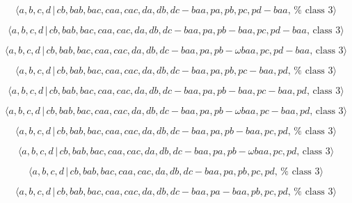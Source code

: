 \documentclass[10pt]{article}
\begin{document}
\begin{equation}
\langle a,b,c,d\,|\,cb,bab,bac,caa,cac,da,db,dc-baa,pa,pb,pc,pd-baa,\,\text{%
class }3\rangle  \tag{7.3817}
\end{equation}

\begin{equation}
\langle a,b,c,d\,|\,cb,bab,bac,caa,cac,da,db,dc-baa,pa,pb-baa,pc,pd-baa,\,%
\text{class }3\rangle  \tag{7.3818}
\end{equation}

\begin{equation}
\langle a,b,c,d\,|\,cb,bab,bac,caa,cac,da,db,dc-baa,pa,pb-\omega
baa,pc,pd-baa,\,\text{class }3\rangle  \tag{7.3819}
\end{equation}

\begin{equation}
\langle a,b,c,d\,|\,cb,bab,bac,caa,cac,da,db,dc-baa,pa,pb,pc-baa,pd,\,\text{%
class }3\rangle  \tag{7.3820}
\end{equation}

\begin{equation}
\langle a,b,c,d\,|\,cb,bab,bac,caa,cac,da,db,dc-baa,pa,pb-baa,pc-baa,pd,\,%
\text{class }3\rangle  \tag{7.3821}
\end{equation}

\begin{equation}
\langle a,b,c,d\,|\,cb,bab,bac,caa,cac,da,db,dc-baa,pa,pb-\omega
baa,pc-baa,pd,\,\text{class }3\rangle  \tag{7.3822}
\end{equation}

\begin{equation}
\langle a,b,c,d\,|\,cb,bab,bac,caa,cac,da,db,dc-baa,pa,pb-baa,pc,pd,\,\text{%
class }3\rangle  \tag{7.3823}
\end{equation}

\begin{equation}
\langle a,b,c,d\,|\,cb,bab,bac,caa,cac,da,db,dc-baa,pa,pb-\omega baa,pc,pd,\,%
\text{class }3\rangle  \tag{7.3824}
\end{equation}

\begin{equation}
\langle a,b,c,d\,|\,cb,bab,bac,caa,cac,da,db,dc-baa,pa,pb,pc,pd,\,\text{%
class }3\rangle  \tag{7.3825}
\end{equation}

\begin{equation}
\langle a,b,c,d\,|\,cb,bab,bac,caa,cac,da,db,dc-baa,pa-baa,pb,pc,pd,\,\text{%
class }3\rangle  \tag{7.3826}
\end{equation}
\end{document}
